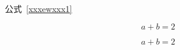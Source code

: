 \documentclass[10pt,hyperref,UTF8]{ctexbook}%
\newcommand\commandnumbernameone{命令}
\newcounter{commandnumber}[section]
\renewcommand\thecommandnumber{\thesection.\arabic{commandnumber}}
\newcommand\fileequalnumbernameone{公式}
\newcounter{fileequalnumber}[section]
\begin{document}
 

	






   {
	
	
	\centerline{\noindent\fileequalnumbernameone\ \ref{xxxewxxx1}}  
	\begin{tcolorbox}[arc=0pt ,
		boxsep=0mm ,
		top=1pt,
		bottom=1pt , 
		colback=sourcegrayone,
		colframe=sourcegrayone   
		] \label{xxxewxxx1} \noindent\begin{equation*}
		a + b = 2\end{equation*}\end{tcolorbox}
}
    
    {
    	
    	\begin{tcolorbox}\noindent\begin{equation*}
    		a + b = 2\end{equation*}\end{tcolorbox}
    }
    
 
	
	\backmatter
	
\end{document}
